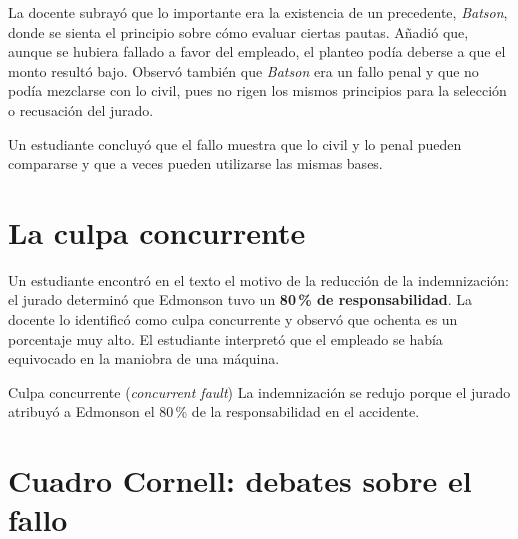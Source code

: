 \documentclass[12pt,oneside]{book}
\begin{document}
La docente subrayó que lo importante era la existencia de un precedente, \textit{Batson}, donde se sienta el principio sobre cómo evaluar ciertas pautas. Añadió que, aunque se hubiera fallado a favor del empleado, el planteo podía deberse a que el monto resultó bajo. Observó también que \textit{Batson} era un fallo penal y que no podía mezclarse con lo civil, pues no rigen los mismos principios para la selección o recusación del jurado.


Un estudiante concluyó que el fallo muestra que lo civil y lo penal pueden compararse y que a veces pueden utilizarse las mismas bases.

\section{La culpa concurrente}

Un estudiante encontró en el texto el motivo de la reducción de la indemnización: el jurado determinó que Edmonson tuvo un \textbf{80\,\% de responsabilidad}. La docente lo identificó como culpa concurrente y observó que ochenta es un porcentaje muy alto. El estudiante interpretó que el empleado se había equivocado en la maniobra de una máquina.

\begin{definition}{Culpa concurrente (\textit{concurrent fault})}
La indemnización se redujo porque el jurado atribuyó a Edmonson el 80\,\% de la responsabilidad en el accidente.
\end{definition}

\section{Cuadro Cornell: debates sobre el fallo}
\end{document}
